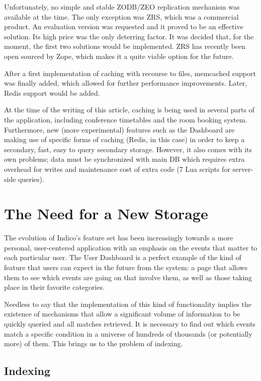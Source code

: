 Unfortunately, no simple and stable ZODB/ZEO replication mechanism was available at the time. The only exception was ZRS, which was a commercial product. An evaluation version was requested and it proved to be an effective solution. Its high price was the only deterring factor. It was decided that, for the moment, the first two solutions would be implemented. ZRS has recently been open sourced by Zope, which makes it a quite viable option for the future.

After a first implementation of caching with recourse to files, memcached support was finally added, which allowed for further performance improvements. Later, Redis support would be added.

At the time of the writing of this article, caching is being used in several parts of the application, including conference timetables and the room booking system. Furthermore, new (more experimental) features such as the Dashboard are making use of specific forms of caching (Redis, in this case) in order to keep a secondary, fast, easy to query secondary storage. However, it also comes with its own problems; data must be synchronized with main DB which requires extra overhead for writes and maintenance cost of extra code (7 Lua scripts for server-side queries).
 
\section{The Need for a New Storage}

The evolution of Indico's feature set has been increasingly towards a more personal, user-centered application with an emphasis on the events that matter to each particular user. The User Dashboard is a perfect example of the kind of feature that users can expect in the future from the system: a page that allows them to see which events are going on that involve them, as well as those taking place in their favorite categories.

Needless to say that the implementation of this kind of functionality implies the existence of mechanisms that allow a significant volume of information to be quickly queried and all matches retrieved. It is necessary to find out which events match a specific condition in a universe of hundreds of thousands (or potentially more) of them. This brings us to the problem of indexing.

\subsection{Indexing}

